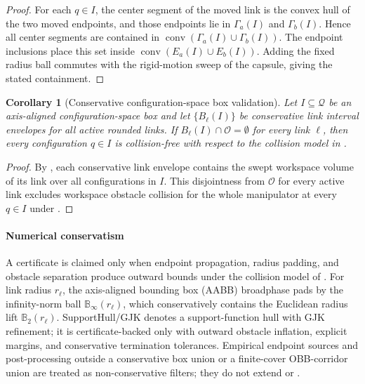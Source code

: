 \documentclass[journal]{IEEEtran}
\newtheorem{corollary}{Corollary}
\newcommand{\Ball}{\ensuremath{\mathbb{B}}}
\newcommand{\calO}{\ensuremath{\mathcal{O}}}
\newcommand{\Q}{\ensuremath{\mathcal{Q}}}
\begin{document}
\begin{proof}
For each $q\in I$, the center segment of the moved link is the convex hull of
the two moved endpoints, and those endpoints lie in
\(\Gamma_a(I)\) and \(\Gamma_b(I)\). Hence all center segments are contained in
\(\operatorname{conv}(\Gamma_a(I)\cup\Gamma_b(I))\). The endpoint inclusions
place this set inside \(\operatorname{conv}(E_a(I)\cup E_b(I))\). Adding the
fixed radius ball commutes with the rigid-motion sweep of the capsule, giving
the stated containment.
\end{proof}

\begin{corollary}[Conservative configuration-space box validation]
\label{cor:box_validation}
Let $I\subseteq\Q$ be an axis-aligned configuration-space box and let
$\{B_\ell(I)\}$ be conservative link interval envelopes for all active rounded links. If
$B_\ell(I)\cap\calO=\emptyset$ for every link $\ell$, then every configuration
$q\in I$ is collision-free with respect to the collision model in
.
\end{corollary}

\begin{proof}
By , each conservative link envelope
contains the swept workspace volume of its link over all configurations in
$I$. This disjointness from $\calO$ for every active link excludes workspace
obstacle collision for the whole manipulator at every $q\in I$ under
.
\end{proof}

\paragraph{Numerical conservatism}
A certificate is claimed only when endpoint propagation, radius padding, and
obstacle separation produce outward bounds under the collision model of
. For link radius \(r_\ell\), the axis-aligned
bounding box (AABB) broadphase pads by the infinity-norm ball
\(\Ball_\infty(r_\ell)\), which conservatively contains the Euclidean radius
lift \(\Ball_2(r_\ell)\). SupportHull/GJK denotes a
support-function hull with GJK refinement; it is certificate-backed only with
outward obstacle inflation, explicit margins, and conservative termination
tolerances. Empirical endpoint sources and post-processing outside a
conservative box union or a finite-cover OBB-corridor union are treated as
non-conservative filters; they do not extend  or
.
\end{document}
